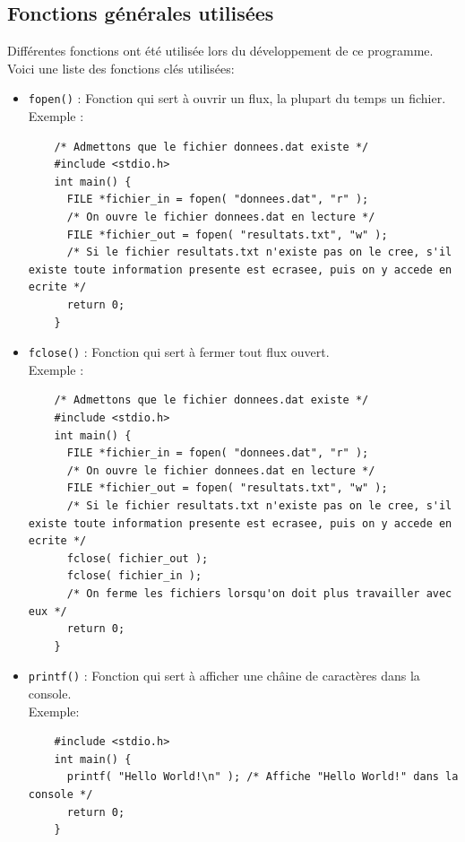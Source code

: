 \documentclass[11pt]{article}
\begin{document}
\subsection{Fonctions générales utilisées}
Différentes fonctions ont été utilisée lors du développement de ce programme.\\
Voici une liste des fonctions clés utilisées:
\begin{itemize}
  
\item \texttt{fopen()} : Fonction qui sert à ouvrir un flux, la plupart du temps un fichier.\\
  Exemple :
  \begin{lstlisting}
    /* Admettons que le fichier donnees.dat existe */
    #include <stdio.h>
    int main() {
      FILE *fichier_in = fopen( "donnees.dat", "r" );
      /* On ouvre le fichier donnees.dat en lecture */
      FILE *fichier_out = fopen( "resultats.txt", "w" );
      /* Si le fichier resultats.txt n'existe pas on le cree, s'il existe toute information presente est ecrasee, puis on y accede en ecrite */
      return 0;
    }
  \end{lstlisting}

\item \texttt{fclose()} : Fonction qui sert à fermer tout flux ouvert.\\
  Exemple :
  \begin{lstlisting}
    /* Admettons que le fichier donnees.dat existe */
    #include <stdio.h>
    int main() {
      FILE *fichier_in = fopen( "donnees.dat", "r" );
      /* On ouvre le fichier donnees.dat en lecture */
      FILE *fichier_out = fopen( "resultats.txt", "w" );
      /* Si le fichier resultats.txt n'existe pas on le cree, s'il existe toute information presente est ecrasee, puis on y accede en ecrite */
      fclose( fichier_out );
      fclose( fichier_in );
      /* On ferme les fichiers lorsqu'on doit plus travailler avec eux */
      return 0;
    }
  \end{lstlisting}

  
\item \texttt{printf()} : Fonction qui sert à afficher une châine de caractères dans la console.\\
  Exemple:
  \begin{lstlisting}
    #include <stdio.h>
    int main() {
      printf( "Hello World!\n" ); /* Affiche "Hello World!" dans la console */
      return 0;
    }
  \end{lstlisting}
  

\end{itemize}
\end{document}
